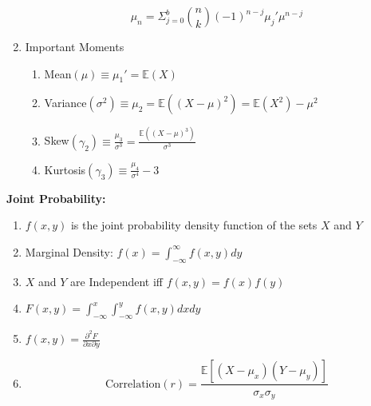 \documentclass[12pt]{article}
\renewcommand{\=}[1]{\stackrel{#1}{=}} %
\theoremstyle{definition}
\theoremstyle{remark}
\begin{document}
\begin{enumerate}
\begin{equation}
      \mu_n = \Sigma_{j=0}^b\binom{n}{k}(-1)^{n-j}\mu_j'\mu^{n-j}
    \end{equation}
  \item Important Moments
    \begin{enumerate}
    \item Mean$(\mu) \equiv \mu_1' = \mathbb{E}(X)$
    \item Variance$(\sigma^2) \equiv \mu_2 = \mathbb{E}((X-\mu)^2)=
      \mathbb{E}(X^2) - \mu^2$
    \item Skew$(\gamma_2) \equiv \frac{\mu_3}{\sigma^3} = \frac{\mathbb{E}((X-\mu)^3)}{\sigma^3}$
    \item Kurtosis$(\gamma_3) \equiv \frac{\mu_4}{\sigma^4} -3$
    \end{enumerate}
  \end{enumerate}

  \newpage
  \textbf{Joint Probability:}
  \begin{enumerate}
  \item $f(x,y)$ is the joint probability density function of the sets
    $X$ and $Y$
  \item Marginal Density: $f(x) = \int_{-\infty}^{\infty}f(x,y)dy$
  \item $X$ and $Y$ are Independent iff $f(x,y) = f(x)f(y)$
  \item $F(x,y) = \int_{-\infty}^{x}\int_{-\infty}^{y}f(x,y)dxdy$
  \item $f(x,y) = \frac{\partial^2 F}{\partial x \partial y}$
  \item
    \begin{equation}
      \textrm{Correlation}(r) =
    \frac{\mathbb{E}[(X-\mu_x)(Y-\mu_y)]}{\sigma_x \sigma_y}
    \end{equation}
  \end{enumerate}
\end{document}

